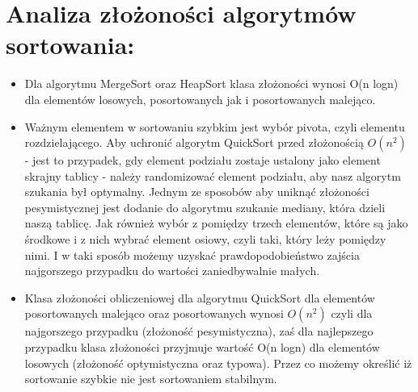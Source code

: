 \documentclass{article}
\begin{document}
\section{Analiza złożoności algorytmów sortowania:}
\begin{itemize}
  \item Dla algorytmu MergeSort oraz HeapSort klasa złożoności wynosi O(n logn) dla elementów losowych, posortowanych jak i posortowanych malejąco.
  \item Ważnym elementem w sortowaniu szybkim jest wybór pivota, czyli elementu rozdzielającego. Aby uchronić algorytm QuickSort przed złożonością $ O(n^{2}) $ - jest to przypadek, gdy element podziału zostaje ustalony jako element skrajny tablicy - należy randomizować element podziału, aby nasz algorytm szukania był optymalny. Jednym ze sposobów aby uniknąć złożoności pesymistycznej jest dodanie do algorytmu szukanie mediany, która dzieli naszą tablicę. Jak również wybór z pomiędzy trzech elementów, które są jako środkowe i z nich wybrać element osiowy, czyli taki, który leży pomiędzy nimi. I w taki sposób możemy uzyskać prawdopodobieństwo zajścia najgorszego przypadku do wartości zaniedbywalnie małych.
  \item Klasa złożoności obliczeniowej dla algorytmu QuickSort dla elementów posortowanych malejąco oraz posortowanych wynosi $ O(n^{2}) $  czyli dla najgorszego przypadku (złożoność pesymistyczna), zaś dla najlepszego przypadku klasa złożoności przyjmuje wartość O(n logn) dla elementów losowych (złożoność optymistyczna oraz typowa). Przez co możemy określić iż sortowanie szybkie nie jest sortowaniem stabilnym.
\end{itemize}
\end{document}
